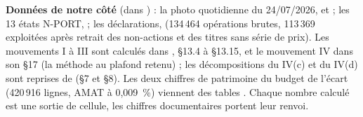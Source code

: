 \documentclass[9pt,a4paper]{extarticle}
\begin{document}
{\scriptsize\textbf{Données de notre côté} (dans ) : la photo quotidienne du 24/07/2026,  et  ; les 13 états N-PORT,  ; les déclarations,  (134\,464 opérations brutes, 113\,369 exploitées après retrait des non-actions et des titres sans série de prix). Les mouvements I à III sont calculés dans , \S13.4 à \S13.15, et le mouvement IV dans son \S17 (la méthode au plafond retenu) ; les décompositions du IV(c) et du IV(d) sont reprises de  (\S7 et \S8). Les deux chiffres de patrimoine du \og{}budget de l'écart\fg{} (420\,916 lignes, AMAT à 0,009~\%) viennent des tables . Chaque nombre calculé est une sortie de cellule, les chiffres documentaires portent leur renvoi.\par}
\end{document}
